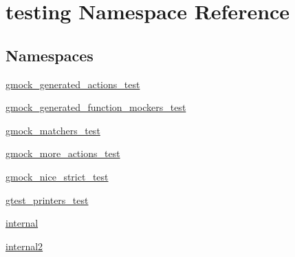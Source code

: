 \hypertarget{namespacetesting}{}\section{testing Namespace Reference}
\label{namespacetesting}
\subsection*{Namespaces}
\begin{DoxyCompactItemize}
\item 
 \mbox{\hyperlink{namespacetesting_1_1gmock__generated__actions__test}{gmock\+\_\+generated\+\_\+actions\+\_\+test}}
\item 
 \mbox{\hyperlink{namespacetesting_1_1gmock__generated__function__mockers__test}{gmock\+\_\+generated\+\_\+function\+\_\+mockers\+\_\+test}}
\item 
 \mbox{\hyperlink{namespacetesting_1_1gmock__matchers__test}{gmock\+\_\+matchers\+\_\+test}}
\item 
 \mbox{\hyperlink{namespacetesting_1_1gmock__more__actions__test}{gmock\+\_\+more\+\_\+actions\+\_\+test}}
\item 
 \mbox{\hyperlink{namespacetesting_1_1gmock__nice__strict__test}{gmock\+\_\+nice\+\_\+strict\+\_\+test}}
\item 
 \mbox{\hyperlink{namespacetesting_1_1gtest__printers__test}{gtest\+\_\+printers\+\_\+test}}
\item 
 \mbox{\hyperlink{namespacetesting_1_1internal}{internal}}
\item 
 \mbox{\hyperlink{namespacetesting_1_1internal2}{internal2}}
\end{DoxyCompactItemize}
